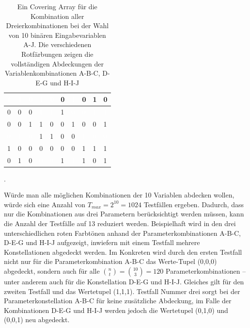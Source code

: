 \begin{table}[!htb]
\begin{tabular}{|l|l|l|l|l|l|l|l|l|l|}
\cellcolor{red1}\textcolor{white}{1} & \cellcolor{red1}\textcolor{white}{1} & \cellcolor{red1}\textcolor{white}{0} & \cellcolor{red2}\textcolor{white}{1} & \cellcolor{red2}\textcolor{white}{0} & 0 & \cellcolor{red2}\textcolor{white}{1} & 0 & 1 & 0 \\ \hline
0 & 0 & 0 & \cellcolor{red2}\textcolor{white}{1} & \cellcolor{red2}\textcolor{white}{1} & 1 & \cellcolor{red2}\textcolor{white}{0} & \cellcolor{red3}\textcolor{white}{0} & \cellcolor{red3}\textcolor{white}{1} & \cellcolor{red3}\textcolor{white}{1} \\ \hline
0 & 0 & 1 & 1 & 0 & 0 & 1 & 0 & 0 & 1 \\ \hline
\cellcolor{red1}\textcolor{white}{0} & \cellcolor{red1}\textcolor{white}{1} & \cellcolor{red1}\textcolor{white}{0} & 1 & 1 & 0 & 0 & \cellcolor{red3}\textcolor{white}{1} & \cellcolor{red3}\textcolor{white}{0} & \cellcolor{red3}\textcolor{white}{0} \\ \hline
1 & 0 & 0 & 0 & 0 & 0 & 0 & 1 & 1 & 1 \\ \hline
0 & 1 & 0 & \cellcolor{red2}\textcolor{white}{0} & \cellcolor{red2}\textcolor{white}{0} & 1 & \cellcolor{red2}\textcolor{white}{1} & 1 & 0 & 1 \\ \hline
\end{tabular}
\caption{Ein Covering Array für die Kombination aller Dreierkombinationen bei der Wahl von 10 binären Eingabevariablen A-J. Die verschiedenen Rotfärbungen zeigen die vollständigen Abdeckungen der Variablenkombinationen A-B-C, D-E-G und H-I-J \cite{kuhn2010practical}}.
\label{tab:3wayInteraction}
\end{table}

Würde man alle möglichen Kombinationen der 10 Variablen abdecken wollen, würde sich eine Anzahl von $T_{max} = 2^{10} = 1024$ Testfällen ergeben. Dadurch, dass nur die Kombinationen aus drei Parametern berücksichtigt werden müssen, kann die Anzahl der Testfälle auf 13 reduziert werden. Beispielhaft wird in den drei unterschiedlichen roten Farbtönen anhand der Parameterkombinationen A-B-C, D-E-G und H-I-J aufgezeigt, inwiefern mit einem Testfall mehrere Konstellationen abgedeckt werden. Im Konkreten wird durch den ersten Testfall nicht nur für die Parameterkombination A-B-C das Werte-Tupel (0,0,0) abgedeckt, sondern auch für alle $\binom{n}{t} = \binom{10}{3} = 120$ Parameterkombinationen -- unter anderem auch für die Konstellation D-E-G und H-I-J. Gleiches gilt für den zweiten Testfall und das Wertetupel (1,1,1). Testfall Nummer drei sorgt bei der Parameterkonstellation A-B-C für keine zusätzliche Abdeckung, im Falle der Kombinationen D-E-G und H-I-J werden jedoch die Wertetupel (0,1,0) und (0,0,1) neu abgedeckt. 

